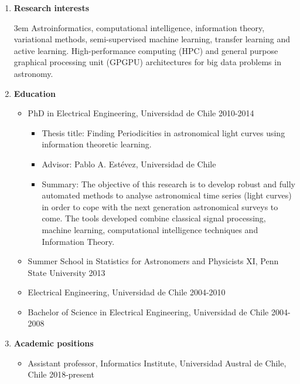 \documentclass[letterpaper,11pt]{article}
\newcommand{\compactlist}{\setlength{\parskip}{0pt} \setlength{\leftskip}{2em}}
\begin{document}
\noindent\makebox[\linewidth]{\rule{\textwidth}{0.4pt}}

\begin{enumerate}[I]  \compactlist

	\item \textbf{Research interests} 
	
	{\leftskip 3em Astroinformatics, computational intelligence, information theory, variational methods, semi-supervised machine learning, transfer learning and active learning. High-performance computing (HPC) and general purpose graphical processing unit (GPGPU) architectures for big data problems in astronomy.\par }

	\item \textbf{Education}
		\begin{itemize} \compactlist
		\item PhD in Electrical Engineering, Universidad de Chile \hfill 2010-2014
		\begin{itemize} \compactlist
			\item Thesis title: Finding Periodicities in astronomical light curves using information theoretic learning. 
			\item Advisor: Pablo A. Est\'evez, Universidad de Chile
			\item Summary: The objective of this research is to develop robust and fully automated methods to analyse astronomical time series (light curves) in order to cope with the next generation astronomical surveys to come. The tools developed combine classical signal processing, machine learning, computational intelligence techniques and Information Theory.
		\end{itemize}
        \item Summer School in Statistics for Astronomers and Physicists XI, Penn State University \hfill 2013
		\item Electrical Engineering, Universidad de Chile \hfill 2004-2010
		\item Bachelor of Science in Electrical Engineering, Universidad de Chile \hfill 2004-2008
		\end{itemize}
	
	\item \textbf{Academic positions}
	    \begin{itemize} \compactlist
	        \item Assistant professor, Informatics Institute, Universidad Austral de Chile, Chile \hfill 2018-present
	    \end{itemize}
	

\end{enumerate}
\end{document}

